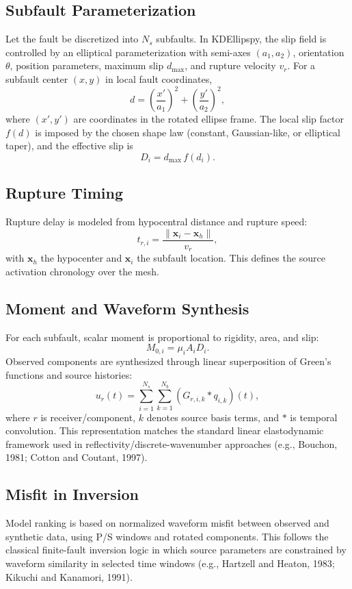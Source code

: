 \subsection{Subfault Parameterization}
Let the fault be discretized into $N_s$ subfaults.
In KDEllipspy, the slip field is controlled by an elliptical parameterization with semi-axes $(a_1,a_2)$, orientation $\theta$, position parameters, maximum slip $d_{\max}$, and rupture velocity $v_r$.
For a subfault center $(x,y)$ in local fault coordinates,
\begin{equation}
d = \left(\frac{x'}{a_1}\right)^2 + \left(\frac{y'}{a_2}\right)^2,
\end{equation}
where $(x',y')$ are coordinates in the rotated ellipse frame.
The local slip factor $f(d)$ is imposed by the chosen shape law (constant, Gaussian-like, or elliptical taper), and the effective slip is
\begin{equation}
D_i = d_{\max} \, f(d_i).
\end{equation}

\subsection{Rupture Timing}
Rupture delay is modeled from hypocentral distance and rupture speed:
\begin{equation}
t_{r,i} = \frac{\|\mathbf{x}_i - \mathbf{x}_h\|}{v_r},
\end{equation}
with $\mathbf{x}_h$ the hypocenter and $\mathbf{x}_i$ the subfault location.
This defines the source activation chronology over the mesh.

\subsection{Moment and Waveform Synthesis}
For each subfault, scalar moment is proportional to rigidity, area, and slip:
\begin{equation}
M_{0,i} = \mu_i A_i D_i.
\end{equation}
Observed components are synthesized through linear superposition of Green's functions and source histories:
\begin{equation}
u_r(t) = \sum_{i=1}^{N_s}\sum_{k=1}^{N_b}\left(G_{r,i,k} * q_{i,k}\right)(t),
\end{equation}
where $r$ is receiver/component, $k$ denotes source basis terms, and $*$ is temporal convolution.
This representation matches the standard linear elastodynamic framework used in reflectivity/discrete-wavenumber approaches (e.g., Bouchon, 1981; Cotton and Coutant, 1997).

\subsection{Misfit in Inversion}
Model ranking is based on normalized waveform misfit between observed and synthetic data, using P/S windows and rotated components.
This follows the classical finite-fault inversion logic in which source parameters are constrained by waveform similarity in selected time windows (e.g., Hartzell and Heaton, 1983; Kikuchi and Kanamori, 1991).
